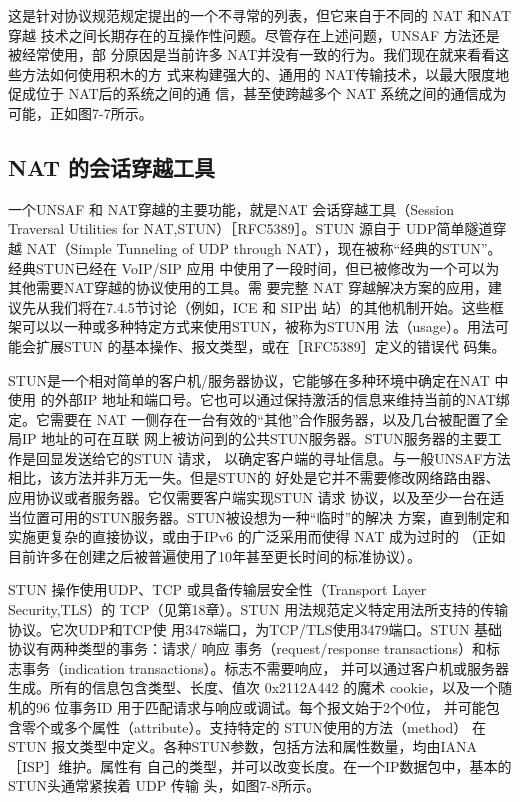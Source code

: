这是针对协议规范规定提出的一个不寻常的列表，但它来自于不同的 NAT 和NAT 穿越
技术之间长期存在的互操作性问题。尽管存在上述问题，UNSAF 方法还是被经常使用，部
分原因是当前许多 NAT并没有一致的行为。我们现在就来看看这些方法如何使用积木的方
式来构建强大的、通用的 NAT传输技术，以最大限度地促成位于 NAT后的系统之间的通
信，甚至使跨越多个 NAT 系统之间的通信成为可能，正如图7-7所示。

\subsection{NAT 的会话穿越工具}

一个UNSAF 和 NAT穿越的主要功能，就是NAT 会话穿越工具（Session Traversal
Utilities for NAT,STUN）［RFC5389］。STUN 源自于 UDP简单隧道穿越 NAT（Simple Tunneling
of UDP through NAT），现在被称“经典的STUN”。经典STUN已经在 VoIP/SIP 应用
中使用了一段时间，但已被修改为一个可以为其他需要NAT穿越的协议使用的工具。需
要完整 NAT 穿越解决方案的应用，建议先从我们将在7.4.5节讨论（例如，ICE 和 SIP出
站）的其他机制开始。这些框架可以以一种或多种特定方式来使用STUN，被称为STUN用
法（usage）。用法可能会扩展STUN 的基本操作、报文类型，或在［RFC5389］定义的错误代
码集。

STUN是一个相对简单的客户机/服务器协议，它能够在多种环境中确定在NAT 中使用
的外部IP 地址和端口号。它也可以通过保持激活的信息来维持当前的NAT绑定。它需要在
NAT 一侧存在一台有效的“其他”合作服务器，以及几台被配置了全局IP 地址的可在互联
网上被访问到的公共STUN服务器。STUN服务器的主要工作是回显发送给它的STUN 请求，
以确定客户端的寻址信息。与一般UNSAF方法相比，该方法并非万无一失。但是STUN的
好处是它并不需要修改网络路由器、应用协议或者服务器。它仅需要客户端实现STUN 请求
协议，以及至少一台在适当位置可用的STUN服务器。STUN被设想为一种“临时”的解决
方案，直到制定和实施更复杂的直接协议，或由于IPv6 的广泛采用而使得 NAT 成为过时的
（正如目前许多在创建之后被普遍使用了10年甚至更长时间的标准协议）。

STUN 操作使用UDP、TCP 或具备传输层安全性（Transport Layer Security,TLS）的
TCP（见第18章）。STUN 用法规范定义特定用法所支持的传输协议。它次UDP和TCP使
用3478端口，为TCP/TLS使用3479端口。STUN 基础协议有两种类型的事务：请求/ 响应
事务（request/response transactions）和标志事务（indication transactions）。标志不需要响应，
并可以通过客户机或服务器生成。所有的信息包含类型、长度、值次 0x2112A442 的魔术
cookie，以及一个随机的96 位事务ID 用于匹配请求与响应或调试。每个报文始于2个0位，
并可能包含零个或多个属性（attribute）。支持特定的 STUN使用的方法（method） 在 STUN
报文类型中定义。各种STUN参数，包括方法和属性数量，均由IANA［ISP］维护。属性有
自己的类型，并可以改变长度。在一个IP数据包中，基本的STUN头通常紧挨着 UDP 传输
头，如图7-8所示。

